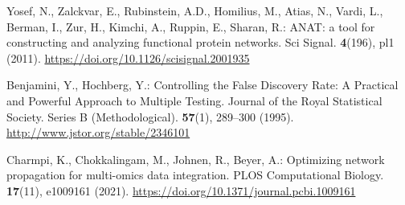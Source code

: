 \documentclass{article}
\begin{document}
\begin{thebibliography}{spmpsci}
Yosef, N., Zalckvar, E., Rubinstein, A.D., Homilius, M., Atias, N., Vardi, L., Berman, I., Zur, H., Kimchi, A., Ruppin, E., Sharan, R.:
ANAT: a tool for constructing and analyzing functional protein networks.
Sci Signal. \textbf{4}(196), pl1 (2011).
\url{https://doi.org/10.1126/scisignal.2001935}

Benjamini, Y., Hochberg, Y.:
Controlling the False Discovery Rate: A Practical and Powerful Approach to Multiple Testing.
Journal of the Royal Statistical Society. Series B (Methodological). \textbf{57}(1), 289--300 (1995).
\url{http://www.jstor.org/stable/2346101}

Charmpi, K., Chokkalingam, M., Johnen, R., Beyer, A.:
Optimizing network propagation for multi-omics data integration.
PLOS Computational Biology. \textbf{17}(11), e1009161 (2021).
\url{https://doi.org/10.1371/journal.pcbi.1009161}

\end{thebibliography}
\end{document}
